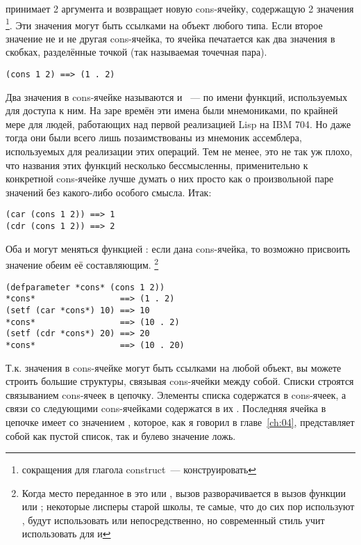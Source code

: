  принимает 2 аргумента и возвращает новую cons-ячейку, содержащую 2 значения
\footnote{ сокращения для глагола construct~--- конструировать}. Эти значения
могут быть ссылками на объект любого типа. Если второе значение не  и не другая
cons-ячейка, то ячейка печатается как два значения в скобках, разделённые точкой (так
называемая точечная пара).

\begin{lstlisting}
(cons 1 2) ==> (1 . 2)
\end{lstlisting}

Два значения в cons-ячейке называются  и ~--- по имени функций,
используемых для доступа к ним. На заре времён эти имена были мнемониками, по крайней мере
для людей, работающих над первой реализацией Lisp на IBM 704. Но даже тогда они были всего
лишь позаимствованы из мнемоник ассемблера, используемых для реализации этих операций. Тем
не менее, это не так уж плохо, что названия этих функций несколько бессмысленны,
применительно к конкретной cons-ячейке лучше думать о них просто как о произвольной паре
значений без какого-либо особого смысла. Итак:

\begin{lstlisting}
(car (cons 1 2)) ==> 1
(cdr (cons 1 2)) ==> 2
\end{lstlisting}

Оба  и  могут меняться функцией : если дана cons-ячейка, то
возможно присвоить значение обеим её составляющим. \footnote{Когда место переданное в
   это  или , вызов  разворачивается в вызов
  функции  или ; некоторые лисперы старой школы, те самые, что
  до сих пор используют , будут использовать  или 
  непосредственно, но современный стиль учит использовать  для  и
  }

\begin{lstlisting}
(defparameter *cons* (cons 1 2))
*cons*                 ==> (1 . 2)
(setf (car *cons*) 10) ==> 10
*cons*                 ==> (10 . 2)
(setf (cdr *cons*) 20) ==> 20
*cons*                 ==> (10 . 20)
\end{lstlisting}

Т.к. значения в cons-ячейке могут быть ссылками на любой объект, вы можете строить большие
структуры, связывая cons-ячейки между собой. Списки строятся связыванием cons-ячеек в
цепочку. Элементы списка содержатся в  cons-ячеек, а связи со следующими
cons-ячейками содержатся в их . Последняя ячейка в цепочке имеет  со
значением , которое, как я говорил в главе~\ref{ch:04}, представляет собой как
пустой список, так и булево значение ложь.

